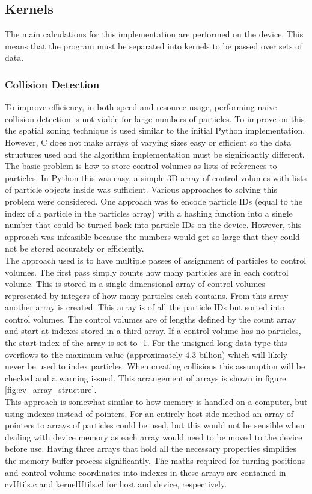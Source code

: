 \documentclass[10pt,a4paper,titlepage]{report}
\begin{document}
\subsection{Kernels}
The main calculations for this implementation are performed on the device. This means that the program must be separated into kernels to be passed over sets of data.
\subsubsection{Collision Detection}
\label{sec:OpenCL Collision Detection}
To improve efficiency, in both speed and resource usage, performing naive collision detection is not viable for large numbers of particles. To improve on this the spatial zoning technique is used similar to the initial Python implementation. However, C does not make arrays of varying sizes easy or efficient so the data structures used and the algorithm implementation must be significantly different.
\\The basic problem is how to store control volumes as lists of references to particles. In Python this was easy, a simple 3D array of control volumes with lists of particle objects inside was sufficient. Various approaches to solving this problem were considered. One approach was to encode particle IDs (equal to the index of a particle in the particles array) with a hashing function into a single number that could be turned back into particle IDs on the device. However, this approach was infeasible because the numbers would get so large that they could not be stored accurately or efficiently.
\\The approach used is to have multiple passes of assignment of particles to control volumes. The first pass simply counts how many particles are in each control volume. This is stored in a single dimensional array of control volumes represented by integers of how many particles each contains. From this array another array is created. This array is of all the particle IDs but sorted into control volumes. The control volumes are of lengths defined by the count array and start at indexes stored in a third array. If a control volume has no particles, the start index of the array is set to -1. For the unsigned long data type this overflows to the maximum value (approximately 4.3 billion) which will likely never be used to index particles. When creating collisions this assumption will be checked and a warning issued. This arrangement of arrays is shown in figure \ref{fig:cv_array_structure}.
\\This approach is somewhat similar to how memory is handled on a computer, but using indexes instead of pointers. For an entirely host-side method an array of pointers to arrays of particles could be used, but this would not be sensible when dealing with device memory as each array would need to be moved to the device before use. Having three arrays that hold all the necessary properties simplifies the memory buffer process significantly. The maths required for turning positions and control volume coordinates into indexes in these arrays are contained in cvUtils.c and kernelUtils.cl for host and device, respectively.
\end{document}
